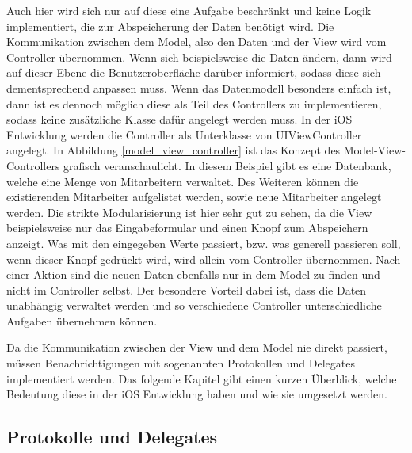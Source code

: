 \documentclass[11pt,a4paper]{report}
\begin{document}
Auch hier wird sich nur auf diese eine Aufgabe beschränkt und keine Logik implementiert, die zur Abspeicherung der Daten benötigt wird. Die Kommunikation zwischen dem Model, also den Daten und der View wird vom Controller übernommen. Wenn sich beispielsweise die Daten ändern, dann wird auf dieser Ebene die Benutzeroberfläche darüber informiert, sodass diese sich dementsprechend anpassen muss. Wenn das Datenmodell besonders einfach ist, dann ist es dennoch möglich diese als Teil des Controllers zu implementieren, sodass keine zusätzliche Klasse dafür angelegt werden muss. In der iOS Entwicklung werden die Controller als Unterklasse von UIViewController angelegt. In Abbildung \ref{model_view_controller} ist das Konzept des Model-View-Controllers grafisch veranschaulicht. In diesem Beispiel gibt es eine Datenbank, welche eine Menge von Mitarbeitern verwaltet. Des Weiteren können die existierenden Mitarbeiter aufgelistet werden, sowie neue Mitarbeiter angelegt werden. Die strikte Modularisierung ist hier sehr gut zu sehen, da die View beispielsweise nur das Eingabeformular und einen Knopf zum Abspeichern anzeigt. Was mit den eingegeben Werte passiert, bzw. was generell passieren soll, wenn dieser Knopf gedrückt wird, wird allein vom Controller übernommen. Nach einer Aktion sind die neuen Daten ebenfalls nur in dem Model zu finden und nicht im Controller selbst. Der besondere Vorteil dabei ist, dass die Daten unabhängig verwaltet werden und so verschiedene Controller unterschiedliche Aufgaben übernehmen können. \cite{harris2014beginning}

Da die Kommunikation zwischen der View und dem Model nie direkt passiert, müssen Benachrichtigungen mit sogenannten Protokollen und Delegates implementiert werden. Das folgende Kapitel gibt einen kurzen Überblick, welche Bedeutung diese in der iOS Entwicklung haben und wie sie umgesetzt werden.

\subsection{Protokolle und Delegates}
\end{document}
